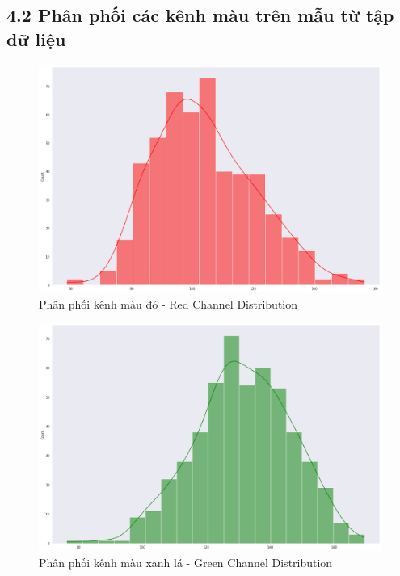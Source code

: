 \documentclass{article}
\begin{document}
	\subsection{4.2 Phân phối các kênh màu trên mẫu từ tập dữ liệu}
	\begin{figure}[H]
		\centering
		\includegraphics[width=1\linewidth]{images/red_channel_distribution.png}
		\caption{Phân phối kênh màu đỏ - Red Channel Distribution}
		\label{fig:writing-thesis}
	\end{figure}
	\begin{figure}[H]
		\centering
		\includegraphics[width=1\linewidth]{images/green_channel_distribution.png}
		\caption{Phân phối kênh màu xanh lá - Green Channel Distribution}
		\label{fig:writing-thesis}
	\end{figure}
\end{document}
